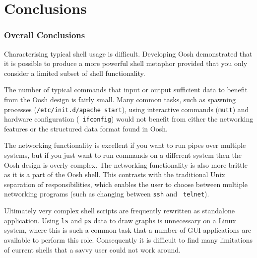 \documentclass[12pt,twoside,notitlepage]{report}
\begin{document}

\cleardoublepage
\chapter{Conclusions}


\subsection{Overall Conclusions}
Characterising typical shell usage is difficult. Developing Oosh
demonstrated that it is possible to produce a more powerful shell
metaphor provided that you only consider a limited subset of shell
functionality. 

The number of typical commands that input or output sufficient data to
benefit from the Oosh design is fairly small. Many common tasks, such
as spawning processes ({\tt /etc/init.d/apache start}), using
interactive commands ({\tt mutt}) and hardware configuration ({\tt
  ifconfig}) would not benefit from either the networking features or
the structured data format found in Oosh.

The networking functionality is excellent if you want to run pipes
over multiple systems, but if you just want to run commands on a
different system then the Oosh design is overly complex. The
networking functionality is also more brittle as it is a part of the
Oosh shell. This contrasts with the traditional Unix separation of
responsibilities, which enables the user to choose between multiple
networking programs (such as changing between {\tt ssh} and {\tt
  telnet}).

Ultimately very complex shell scripts are frequently rewritten as
standalone application. Using {\tt ls} and {\tt ps} data to draw
graphs is unnecessary on a Linux system, where this is such a common
task that a number of GUI applications are available to perform this
role. Consequently it is difficult to find many limitations of current
shells that a savvy user could not work around.
\end{document}
